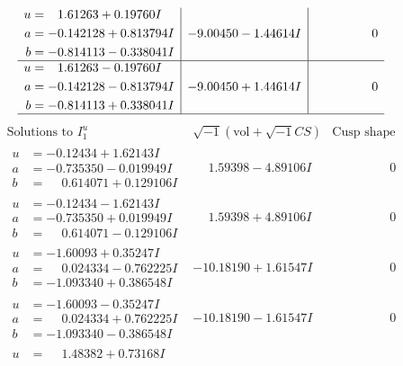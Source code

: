 \documentclass[1p]{elsarticle_modified}
\theoremstyle{definition}
\newcommand{\I}{\sqrt{-1}}
\begin{document}
$$\begin{array}{c|c|c}
\begin{aligned}
u &= \phantom{-}1.61263 + 0.19760 I \\
a &= -0.142128 + 0.813794 I \\
b &= -0.814113 - 0.338041 I\end{aligned}
 & -9.00450 - 1.44614 I & \phantom{-0.000000 } 0 \\ \hline\begin{aligned}
u &= \phantom{-}1.61263 - 0.19760 I \\
a &= -0.142128 - 0.813794 I \\
b &= -0.814113 + 0.338041 I\end{aligned}
 & -9.00450 + 1.44614 I & \phantom{-0.000000 } 0\\
 \hline 
 \end{array}$$\newpage$$\begin{array}{c|c|c}  
\text{Solutions to }I^u_{1}& \I (\text{vol} + \sqrt{-1}CS) & \text{Cusp shape}\\
 \hline 
\begin{aligned}
u &= -0.12434 + 1.62143 I \\
a &= -0.735350 - 0.019949 I \\
b &= \phantom{-}0.614071 + 0.129106 I\end{aligned}
 & \phantom{-}1.59398 - 4.89106 I & \phantom{-0.000000 } 0 \\ \hline\begin{aligned}
u &= -0.12434 - 1.62143 I \\
a &= -0.735350 + 0.019949 I \\
b &= \phantom{-}0.614071 - 0.129106 I\end{aligned}
 & \phantom{-}1.59398 + 4.89106 I & \phantom{-0.000000 } 0 \\ \hline\begin{aligned}
u &= -1.60093 + 0.35247 I \\
a &= \phantom{-}0.024334 - 0.762225 I \\
b &= -1.093340 + 0.386548 I\end{aligned}
 & -10.18190 + 1.61547 I & \phantom{-0.000000 } 0 \\ \hline\begin{aligned}
u &= -1.60093 - 0.35247 I \\
a &= \phantom{-}0.024334 + 0.762225 I \\
b &= -1.093340 - 0.386548 I\end{aligned}
 & -10.18190 - 1.61547 I & \phantom{-0.000000 } 0 \\ \hline\begin{aligned}
u &= \phantom{-}1.48382 + 0.73168 I \\

\end{aligned}
\end{array}$$
\end{document}
